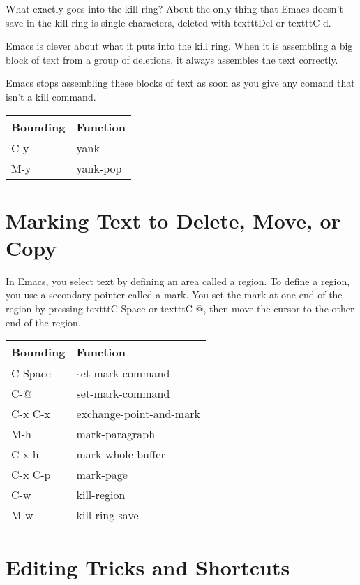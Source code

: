 \documentclass{book}
\newcommand{\head}[1]{\textnormal{\textbf{#1}}}
\newcommand{\keyboard}[1]{\textnormal{texttt{#1}}}
\begin{document}
What exactly goes into the kill ring?
About the only thing that Emacs doesn't save in the kill ring is single characters, deleted with \keyboard{Del} or \keyboard{C-d}.

Emacs is clever about what it puts into the kill ring.
When it is assembling a big block of text from a group of deletions, it always assembles the text correctly.

Emacs stops assembling these blocks of text as soon as you give any comand that isn't a kill command.
\linebreak
\linebreak
\begin{tabular}{ll}
  \toprule[1.5pt]
  \head{Bounding} & \head{Function} \\
  \midrule
  C-y      & yank     \\
  M-y      & yank-pop \\
  \bottomrule
\end{tabular}


\section{Marking Text to Delete, Move, or Copy}
In Emacs, you select text by defining an area called a region. To define a region, you use a secondary pointer called a mark. You set the mark at one end of the region by pressing \keyboard{C-Space} or \keyboard{C-@}, then move the cursor to the other end of the region.


\begin{tabular}{ll}
  \toprule[1.5pt]
  \head{Bounding} & \head{Function} \\
  \midrule
  C-Space  & set-mark-command        \\
  C-@      & set-mark-command        \\
  C-x C-x  & exchange-point-and-mark \\
  M-h      & mark-paragraph          \\
  C-x h    & mark-whole-buffer       \\
  C-x C-p  & mark-page               \\
  \midrule
  C-w      & kill-region             \\
  M-w      & kill-ring-save          \\
  \bottomrule
\end{tabular}

    
\section{Editing Tricks and Shortcuts}
\end{document}
